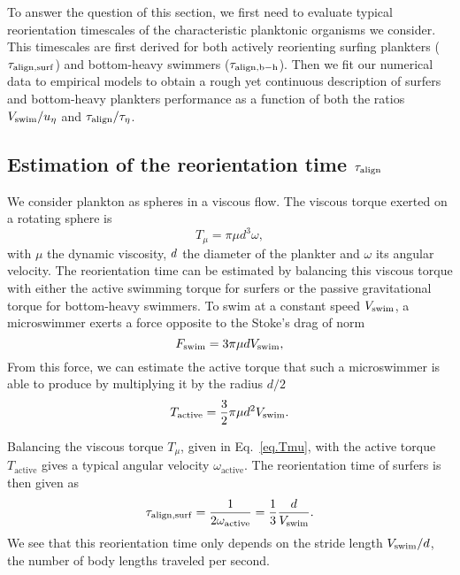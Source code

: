 To answer the question of this section, we first need to evaluate typical reorientation timescales of the characteristic planktonic organisms we consider.
This timescales are first derived for both actively reorienting surfing plankters ($\tau_{\mathrm{align}, \mathrm{surf}}$) and bottom-heavy swimmers ($\tau_{\mathrm{align}, \mathrm{b-h}}$).
Then we fit our numerical data to empirical models to obtain a rough yet continuous description of surfers and bottom-heavy plankters performance as a function of both the ratios $V_{\mathrm{swim}}/u_{\eta}$ and $\tau_{\mathrm{align}}/\tau_{\eta}$.

\subsection{Estimation of the reorientation time $\tau_{\mathrm{align}}$}\label{sec:bio_time}

We consider plankton as spheres in a viscous flow.
The viscous torque exerted on a rotating sphere is \citep{lamb1945hydrodynamics}
\begin{equation}\label{eq.Tmu}
	T_{\mu} = \pi \mu d^3 \omega \mathrm{,}
\end{equation}
with $\mu$ the dynamic viscosity, $d$ the diameter of the plankter and $\omega$ its angular velocity.
The reorientation time can be estimated by balancing this viscous torque with either the active swimming torque for surfers or the passive gravitational torque for bottom-heavy swimmers.
To swim at a constant speed $V_{\mathrm{swim}}$, a microswimmer exerts a force opposite to the Stoke's drag of norm \citep{stokes1851effect}
\begin{equation}
	F_{\mathrm{swim}} = 3 \pi \mu d V_{\mathrm{swim}} \mathrm{,}
\end{equation}
From this force, we can estimate the active torque that such a microswimmer is able to produce by multiplying it by the radius $d/2$
\begin{equation}
	T_{\mathrm{active}} = \frac{3}{2} \pi \mu d^2 V_{\mathrm{swim}} \mathrm{.}
\end{equation}

Balancing the viscous torque $T_{\mu}$, given in Eq.~\eqref{eq.Tmu}, with the active torque $T_{\mathrm{active}}$ gives a typical angular velocity $\omega_{\mathrm{active}}$. The reorientation time of surfers is then given as
\begin{equation}
	\tau_{\mathrm{align}, \mathrm{surf}} = \frac{1}{2\omega_{\mathrm{active}}}=\frac{1}{3} \frac{d}{V_{\mathrm{swim}}}.
\end{equation}
We see that this reorientation time only depends on the stride length $V_{\mathrm{swim}} / d$, the number of body lengths traveled per second.


